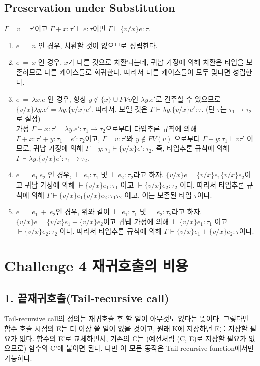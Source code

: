 \documentclass[a4paper]{article}
\begin{document}
\subsection*{Preservation under Substitution}
$\Gamma \vdash v = \tau'$이고 $\Gamma + x : \tau' \vdash e : \tau$이면 $\Gamma \vdash \{v/x\}e : \tau$.
\begin{enumerate}
	\item $e\ =\ n$ 인 경우, 치환할 것이 없으므로 성립한다.
	\item $e\ =\ x$ 인 경우, $x$가 다른 것으로 치환되는데, 귀납 가정에 의해 치환은 타입을 보존하므로 다른 케이스들로 회귀한다. 따라서 다른 케이스들이 모두 맞다면 성립한다.
	\item $e\ =\ \lambda x.e$ 인 경우, 항상 $y \notin \{x\} \cup FVv$인 $\lambda y.e'$로 간주할 수 있으므로 $\{v/x\}\lambda y.e' = \lambda y.\{v/x\}e'.$ 따라서, 보일 것은 $\Gamma \vdash \lambda y.\{v/x\}e' : \tau$. (단 $\tau$는 $\tau_1 \rightarrow \tau_2$로 설정) \\
	가정 $\Gamma + x : \tau' \vdash \lambda y.e' : \tau_1 \rightarrow \tau_2 $으로부터 타입추론 규칙에 의해 $\Gamma + x : \tau' + y : \tau_1 \vdash e' : \tau_2 $이고, $\Gamma \vdash v : \tau'$와 $y \notin FV(v)$ 으로부터 $\Gamma + y : \tau_1 \vdash v  \tau' $ 이므로, 귀납 가정에 의해 $\Gamma + y : \tau_1 \vdash \{v/x\}e' : \tau_2$. 즉, 타입추론 규칙에 의해 $\Gamma \vdash \lambda y.\{v/x\}e' : \tau_1 \rightarrow \tau_2$.
	
	\item $e\ =\ {e}_{1}\ {e}_{2}$ 인 경우, $\vdash\ e_1 : \tau_1$ 및 $\vdash e_2 : \tau_2$라고 하자. $\{v/x\}e = \{v/x\}e_1 \{v/x\}e_2$이고 귀납 가정에 의해 $\vdash \{v/x\}e_1 : \tau_1$ 이고 $\vdash \{v/x\}e_2 : \tau_2$ 이다. 따라서 타입추론 규칙에 의해 $\Gamma \vdash \{v/x\}e_1 \{v/x\}e_2 : \tau_1 \tau_2$ 이고, 이는 보존된 타입 $\tau$이다.
	
	\item $e\ =\ e_1\ +\ e_2$인 경우, 위와 같이 $\vdash\ e_1 : \tau_1$ 및 $\vdash e_2 : \tau_2$라고 하자. $\{v/x\}e = \{v/x\}e_1 + \{v/x\}e_2$이고 귀납 가정에 의해 $\vdash \{v/x\}e_1 : \tau_1$ 이고 $\vdash \{v/x\}e_2 : \tau_2$ 이다. 따라서 타입추론 규칙에 의해 $\Gamma \vdash \{v/x\}e_1 + \{v/x\}e_2 : \tau$이다.
\end{enumerate}


\section*{Challenge 4 재귀호출의 비용}
\subsection*{1. 끝재귀호출(Tail-recursive call)}
Tail-recursive call의 정의는 재귀호출 후 할 일이 아무것도 없다는 뜻이다. 그렇다면 함수 호출 시점의 E는 더 이상 쓸 일이 없을 것이고, 원래 K에 저장하던 E를 저장할 필요가 없다. 함수의 E'로 교체하면서, 기존의 C는 (예전처럼 (C, E)로 저장할 필요가 없으므로) 함수의 C'에 붙이면 된다. 다만 이 모든 동작은 Tail-recursive function에서만 가능하다. 
\end{document}
